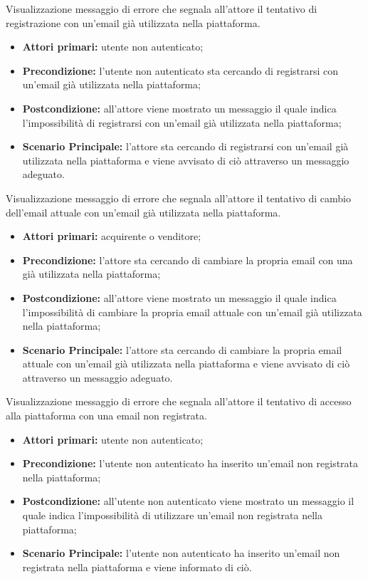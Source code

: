 Visualizzazione messaggio di errore che segnala all'attore il tentativo di registrazione con un'email già utilizzata nella piattaforma.
\begin{itemize}
    \item \textbf{Attori primari:} utente non autenticato;
    \item \textbf{Precondizione:} l'utente non autenticato sta cercando di registrarsi con un'email già utilizzata nella piattaforma;
    \item \textbf{Postcondizione:} all'attore viene mostrato un messaggio il quale indica l'impossibilità di registrarsi con un'email già utilizzata nella piattaforma;
    \item \textbf{Scenario Principale:} l'attore sta cercando di registrarsi con un'email già utilizzata nella piattaforma e viene avvisato di ciò attraverso un messaggio adeguato.
\end{itemize}

Visualizzazione messaggio di errore che segnala all'attore il tentativo di cambio dell'email attuale con un'email già utilizzata nella piattaforma.
\begin{itemize}
    \item \textbf{Attori primari:} acquirente o venditore;
    \item \textbf{Precondizione:} l'attore sta cercando di cambiare la propria email con una già utilizzata nella piattaforma;
    \item \textbf{Postcondizione:} all'attore viene mostrato un messaggio il quale indica l'impossibilità di cambiare la propria email attuale con un'email già utilizzata nella piattaforma;
    \item \textbf{Scenario Principale:} l'attore sta cercando di cambiare la propria email attuale con un'email già utilizzata nella piattaforma e viene avvisato di ciò attraverso un messaggio adeguato.
\end{itemize}

Visualizzazione messaggio di errore che segnala all'attore il tentativo di accesso alla piattaforma con una email non registrata.
\begin{itemize}
    \item \textbf{Attori primari:} utente non autenticato;
    \item \textbf{Precondizione:} l'utente non autenticato ha inserito un'email non registrata nella piattaforma;
    \item \textbf{Postcondizione:} all'utente non autenticato viene mostrato un messaggio il quale indica l'impossibilità di utilizzare un'email non registrata nella piattaforma;
    \item \textbf{Scenario Principale:} l'utente non autenticato ha inserito un'email non registrata nella piattaforma e viene informato di ciò.
\end{itemize}

